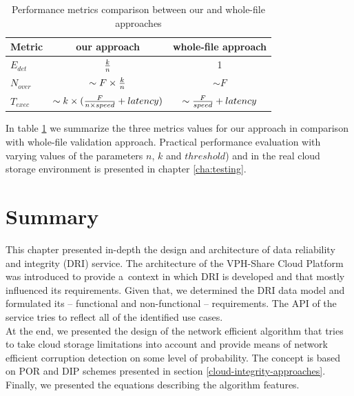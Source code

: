 \begin{table}[h!]
\centering
\begin{tabular}{|l||c|c|}
	\hline
	Metric     & our approach                                           & whole-file approach \\ \hline \hline
	$E_{det}$  & ${k \over n}$                                          & 1 \\ \hline
	$N_{over}$ & $\sim F \times {k \over n}$                            & $\sim F$ \\ \hline
	$T_{exec}$ & $\sim k \times ({F \over {n \times speed}} + latency)$ & $\sim {F \over speed} + latency$ \\ \hline
\end{tabular}
\caption{Performance metrics comparison between our and whole-file approaches}
\label{tab:metrics-comparison}
\end{table}

In table \ref{tab:metrics-comparison} we summarize the three metrics values
for our approach in comparison with whole-file validation approach. Practical
performance evaluation with varying values of the parameters $n$, $k$ and
$threshold$) and in the real cloud storage environment is presented in chapter
\ref{cha:testing}.

\section{Summary}
This chapter presented in-depth the design and architecture of data reliability and
integrity (DRI) service. The architecture of the VPH-Share Cloud Platform was introduced
to provide a~context in which DRI is developed and that mostly influenced its requirements.
Given that, we determined the DRI data model and formulated its -- functional and non-functional
-- requirements. The API of the service tries to reflect all of the identified use cases.\\

At the end, we presented the design of the network efficient algorithm that
tries to take cloud storage limitations into account and provide means of network efficient
corruption detection on some level of probability. The concept is based on POR and DIP schemes presented in section
\ref{cloud-integrity-approaches}. Finally, we presented the equations describing the algorithm features.

